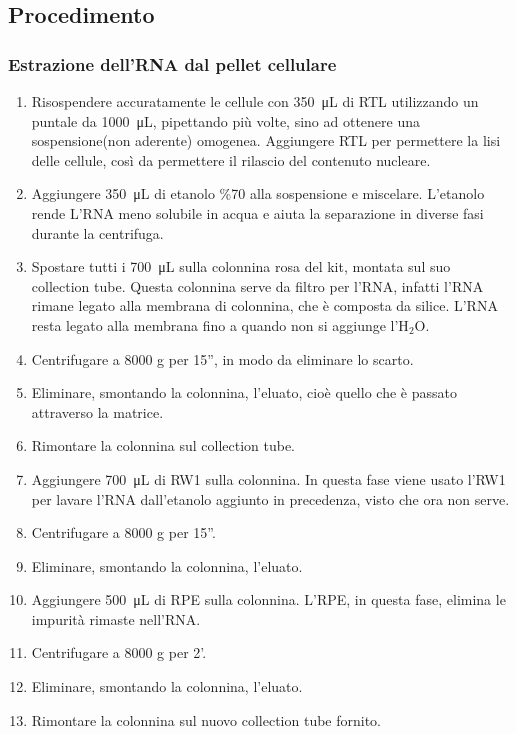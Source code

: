 \subsection{Procedimento}

\subsubsection{Estrazione dell'RNA dal pellet cellulare}
\begin{enumerate}

\item Risospendere accuratamente le cellule con \SI{350}{\micro\liter} di RTL
utilizzando un puntale da \SI{1000}{\micro\liter}, pipettando più volte,
sino ad ottenere una sospensione(non aderente) omogenea.
Aggiungere RTL per permettere la lisi delle cellule,
così da permettere il rilascio del contenuto nucleare.
\item Aggiungere \SI{350}{\micro\liter} di etanolo \%70 alla sospensione e miscelare.
L'etanolo rende L'RNA meno solubile in acqua e aiuta la separazione in diverse fasi durante la centrifuga.
\item Spostare tutti i \SI{700}{\micro\liter} sulla colonnina rosa del kit,
montata sul suo collection tube.
Questa colonnina serve da filtro per l'RNA, infatti l'RNA rimane legato alla
membrana di colonnina, che è composta da silice.
L'RNA resta legato alla membrana fino a quando non si aggiunge l'H$_2$O.
\item Centrifugare a 8000 g per 15'', in modo da eliminare lo scarto.
\item Eliminare, smontando la colonnina, l'eluato, cioè quello che è passato attraverso la matrice.
\item Rimontare la colonnina sul collection tube.
\item Aggiungere \SI{700}{\micro\liter} di RW1 sulla colonnina.
In questa fase viene usato l'RW1 per lavare l'RNA dall'etanolo aggiunto in precedenza,
visto che ora non serve.
\item Centrifugare a 8000 g per 15''.
\item Eliminare, smontando la colonnina, l'eluato.
\item Aggiungere  \SI{500}{\micro\liter} di RPE sulla colonnina.
L'RPE, in questa fase, elimina le impurità rimaste nell'RNA.
\item Centrifugare a 8000 g per 2'.
\item Eliminare, smontando la colonnina, l'eluato.
\item Rimontare la colonnina sul nuovo collection tube fornito.

\end{enumerate}
